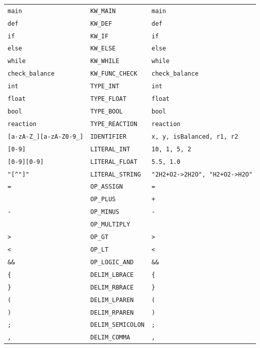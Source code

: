 \documentclass[11pt, letterpaper]{article}
\begin{document}
\begin{longtable}{lll}
\texttt{main} & \texttt{KW\_MAIN} & \texttt{main} \\
\texttt{def} & \texttt{KW\_DEF} & \texttt{def} \\
\texttt{if} & \texttt{KW\_IF} & \texttt{if} \\
\texttt{else} & \texttt{KW\_ELSE} & \texttt{else} \\
\texttt{while} & \texttt{KW\_WHILE} & \texttt{while} \\
\texttt{check\_balance} & \texttt{KW\_FUNC\_CHECK} & \texttt{check\_balance} \\
\texttt{int} & \texttt{TYPE\_INT} & \texttt{int} \\
\texttt{float} & \texttt{TYPE\_FLOAT} & \texttt{float} \\
\texttt{bool} & \texttt{TYPE\_BOOL} & \texttt{bool} \\
\texttt{reaction} & \texttt{TYPE\_REACTION} & \texttt{reaction} \\
\texttt{[a-zA-Z\_][a-zA-Z0-9\_]\*} & \texttt{IDENTIFIER} & \texttt{x, y, isBalanced, r1, r2} \\
\texttt{[0-9]\+} & \texttt{LITERAL\_INT} & \texttt{10, 1, 5, 2} \\
\texttt{[0-9]\+\.[0-9]\+} & \texttt{LITERAL\_FLOAT} & \texttt{5.5, 1.0} \\
\texttt{"[\^{}"]\*"} & \texttt{LITERAL\_STRING} & \texttt{"2\*H2+O2->2\*H2O", "H2+O2->H2O"} \\
\texttt{=} & \texttt{OP\_ASSIGN} & \texttt{=} \\
\texttt{\+} & \texttt{OP\_PLUS} & \texttt{+} \\
\texttt{-} & \texttt{OP\_MINUS} & \texttt{-} \\
\texttt{\*}} & \texttt{OP\_MULTIPLY} & \texttt{\*} \\
\texttt{>} & \texttt{OP\_GT} & \texttt{>} \\
\texttt{<} & \texttt{OP\_LT} & \texttt{<} \\
\texttt{\&\&} & \texttt{OP\_LOGIC\_AND} & \texttt{\&\&} \\
\texttt{\{} & \texttt{DELIM\_LBRACE} & \texttt{\{} \\
\texttt{\}} & \texttt{DELIM\_RBRACE} & \texttt{\}} \\
\texttt{(} & \texttt{DELIM\_LPAREN} & \texttt{(} \\
\texttt{)} & \texttt{DELIM\_RPAREN} & \texttt{)} \\
\texttt{;} & \texttt{DELIM\_SEMICOLON} & \texttt{;} \\
\texttt{,} & \texttt{DELIM\_COMMA} & \texttt{,} \\





\end{longtable}
\end{document}
